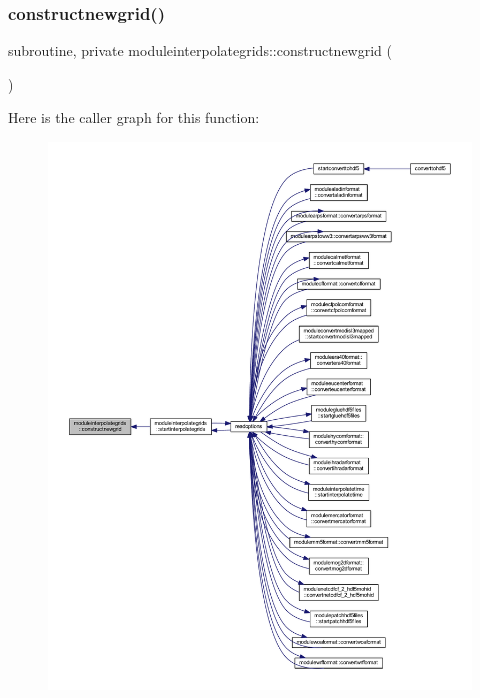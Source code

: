 \subsubsection{\texorpdfstring{constructnewgrid()}{constructnewgrid()}}
{\footnotesize\ttfamily subroutine, private moduleinterpolategrids\+::constructnewgrid (\begin{DoxyParamCaption}{ }\end{DoxyParamCaption})\hspace{0.3cm}{\ttfamily [private]}}

Here is the caller graph for this function\+:\nopagebreak
\begin{figure}[H]
\begin{center}
\leavevmode
\includegraphics[width=350pt]{namespacemoduleinterpolategrids_a569cf42cfeb7e7bc12b2bab66c56a0b1_icgraph}
\end{center}
\end{figure}
\mbox{\label{namespacemoduleinterpolategrids_ad2efee291ef78f4157e38ef104255bc3}} 
